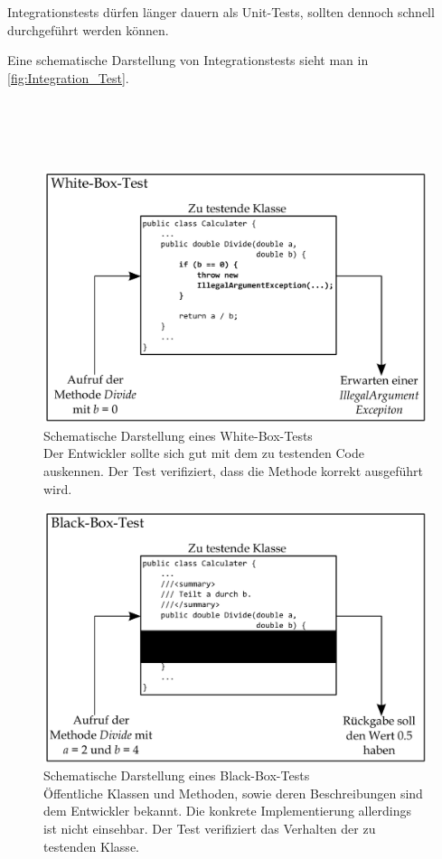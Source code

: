 Integrationstests dürfen länger dauern als Unit-Tests, sollten dennoch schnell durchgeführt werden können.

Eine schematische Darstellung von Integrationstests sieht man in \autoref{fig:Integration_Test}.\\\\\\\\\\

\begin{figure}[h]
\centering
\includegraphics[width=0.8\linewidth]{./images/Kapitel_Einleitung/White_Box_Test.pdf}
\caption[Schematische Darstellung eines White-Box-Tests]{Schematische Darstellung eines White-Box-Tests\\Der Entwickler sollte sich gut mit dem zu testenden Code auskennen. Der Test verifiziert, dass die Methode korrekt ausgeführt wird.}
\label{fig:White_Box_Test}
\end{figure}

\begin{figure}[h]
\centering
\includegraphics[width=0.8\linewidth]{./images/Kapitel_Einleitung/Black_Box_Test.pdf}
\caption[Schematische Darstellung eines Black-Box-Tests]{Schematische Darstellung eines Black-Box-Tests\\Öffentliche Klassen und Methoden, sowie deren Beschreibungen sind dem Entwickler bekannt. Die konkrete Implementierung allerdings ist nicht einsehbar. Der Test verifiziert das Verhalten der zu testenden Klasse.}
\label{fig:Black_Box_Test}
\end{figure}

